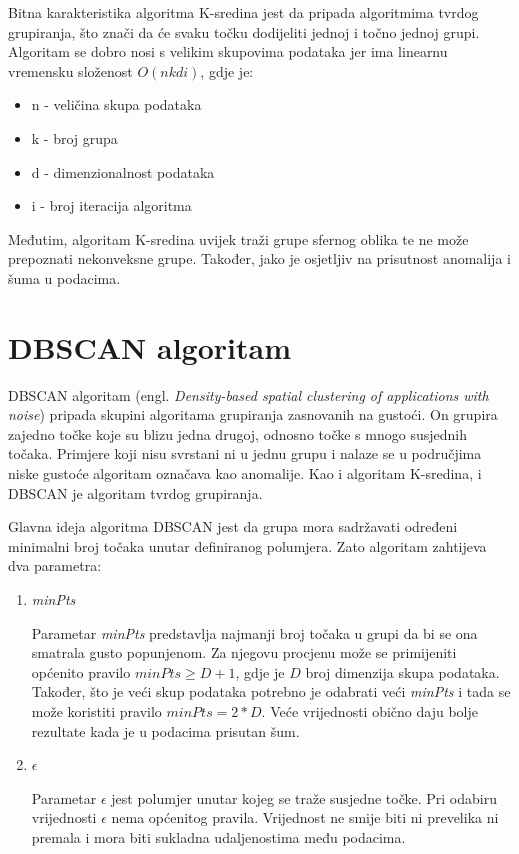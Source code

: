 \documentclass[utf8, diplomski, numeric]{fer}
\begin{document}
Bitna karakteristika algoritma K-sredina jest da pripada algoritmima tvrdog grupiranja, što znači da će svaku točku dodijeliti jednoj i točno jednoj grupi. Algoritam se dobro nosi s velikim skupovima podataka jer ima linearnu vremensku složenost $O(nkdi)$, gdje je:
\begin{itemize}
\item n - veličina skupa podataka
\item k - broj grupa
\item d - dimenzionalnost podataka
\item i - broj iteracija algoritma
\end{itemize}

Međutim, algoritam K-sredina uvijek traži grupe sfernog oblika te ne može prepoznati nekonveksne grupe. Također, jako je osjetljiv na prisutnost anomalija i šuma u podacima.

\section{DBSCAN algoritam}
DBSCAN algoritam (engl. \textit{Density-based spatial clustering of applications with noise}) pripada skupini algoritama grupiranja zasnovanih na gustoći. On grupira zajedno točke koje su blizu jedna drugoj, odnosno točke s mnogo susjednih točaka. Primjere koji nisu svrstani ni u jednu grupu i nalaze se u područjima niske gustoće algoritam označava kao anomalije. Kao i algoritam K-sredina, i DBSCAN je algoritam tvrdog grupiranja.

Glavna ideja algoritma DBSCAN jest da grupa mora sadržavati određeni minimalni broj točaka unutar definiranog polumjera. Zato algoritam zahtijeva dva parametra: 
\begin{enumerate}
\item \textit{minPts} 

Parametar \textit{minPts} predstavlja najmanji broj točaka u grupi da bi se ona smatrala gusto popunjenom. Za njegovu procjenu može se primijeniti općenito pravilo $minPts \geq D + 1$, gdje je $D$ broj dimenzija skupa podataka. Također, što je veći skup podataka potrebno je odabrati veći \textit{minPts} i tada se može koristiti pravilo $minPts = 2*D$. Veće vrijednosti obično daju bolje rezultate kada je u podacima prisutan šum.
\item $\epsilon$

Parametar $\epsilon$ jest polumjer unutar kojeg se traže susjedne točke. Pri odabiru vrijednosti $\epsilon$ nema općenitog pravila. Vrijednost ne smije biti ni prevelika ni premala i mora biti sukladna udaljenostima među podacima. 
\end{enumerate}
\end{document}

